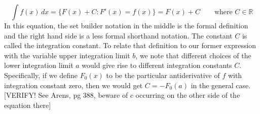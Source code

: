 \begin{equation}
 \int f(x) \, dx = 	\{ F(x) + C : F'(x) = f(x) \} = F(x) + C \qquad \text{where } C \in \mathbb{R}
\end{equation}
In this equation, the set builder notation in the middle is the formal definition and the right hand side is a less formal shorthand notation. The constant $C$ is called the integration constant. To relate that definition to our former expression with the variable upper integration limit $b$, we note that different choices of the lower integration limit $a$ would give rise to different integration constants $C$. Specifically, if we define $F_0(x)$ to be the particular antiderivative of $f$ with integration constant zero, then we would get $C = -F_0(a)$ in the general case. [VERIFY! See Arens, pg 388, beware of $c$ occurring on the other side of the equation there]



%

